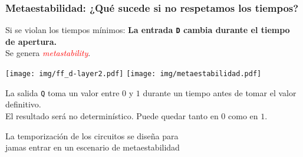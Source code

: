 \documentclass[aspectratio=169]{beamer}
\begin{document}
\begin{frame}[fragile,t]
    \frametitle{Metaestabilidad: ¿Qué sucede si no respetamos los tiempos?}
    Si se violan los tiempos mínimos: \textbf{La entrada \texttt{D} cambia durante el tiempo de apertura.}\\
    \bigskip
    \pause
    Se genera {\Large \textcolor{red}{\emph{metastability}}.}\\
    \begin{center}
    \texttt{[image: img/ff\_d-layer2.pdf]} \hspace{2cm} \texttt{[image: img/metaestabilidad.pdf]}
    \end{center}
    La salida \texttt{Q} toma un valor entre $0$ y $1$ durante un tiempo antes de tomar el valor definitivo.\\
    \bigskip
    \pause
    El resultado será no determinístico. Puede quedar tanto en $0$ como en $1$.\\
    \begin{center}
    \textcolor{verdeuca}{La temporización de los circuitos se diseña para\\
    jamas entrar en un escenario de metaestabilidad}
    \end{center}
\end{frame}
\end{document}
